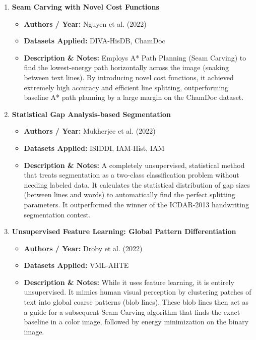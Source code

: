 \documentclass{article}
\begin{document}
\begin{enumerate}[label=\textbf{\arabic*.}]
    \item \textbf{Seam Carving with Novel Cost Functions}
    \begin{itemize}
        \item \textbf{Authors / Year:} Nguyen et al. (2022)
        \item \textbf{Datasets Applied:} DIVA-HisDB, ChamDoc
        \item \textbf{Description \& Notes:} Employs A* Path Planning (Seam Carving) to find the lowest-energy path horizontally across the image (snaking between text lines). By introducing novel cost functions, it achieved extremely high accuracy and efficient line splitting, outperforming baseline A* path planning by a large margin on the ChamDoc dataset.
    \end{itemize}

    \item \textbf{Statistical Gap Analysis-based Segmentation}
    \begin{itemize}
        \item \textbf{Authors / Year:} Mukherjee et al. (2022)
        \item \textbf{Datasets Applied:} ISIDDI, IAM-Hist, IAM
        \item \textbf{Description \& Notes:} A completely unsupervised, statistical method that treats segmentation as a two-class classification problem without needing labeled data. It calculates the statistical distribution of gap sizes (between lines and words) to automatically find the perfect splitting parameters. It outperformed the winner of the ICDAR-2013 handwriting segmentation contest.
    \end{itemize}
    
    \item \textbf{Unsupervised Feature Learning: Global Pattern Differentiation}
    \begin{itemize}
        \item \textbf{Authors / Year:} Droby et al. (2022)
        \item \textbf{Datasets Applied:} VML-AHTE
        \item \textbf{Description \& Notes:} While it uses feature learning, it is entirely unsupervised. It mimics human visual perception by clustering patches of text into global coarse patterns (blob lines). These blob lines then act as a guide for a subsequent Seam Carving algorithm that finds the exact baseline in a color image, followed by energy minimization on the binary image.
    \end{itemize}

\end{enumerate}
\end{document}
